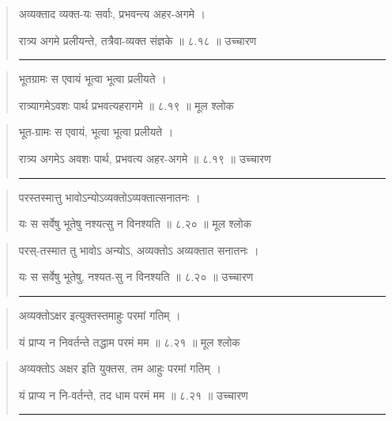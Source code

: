 \begin{quotation}

अव्यक्ताद व्यक्त-यः सर्वाः, प्रभवन्त्य अहर-अगमे  ।  

रात्र्य अगमे प्रलीयन्ते, तत्रैवा-व्यक्त संज्ञके  ॥ ८.१८ ॥  उच्चारण

\noindent\rule{16cm}{0.4pt} 
\end{quotation}


\begin{quotation} 

भूतग्रामः स एवायं भूत्वा भूत्वा प्रलीयते  ।  

रात्र्यागमेऽवशः पार्थ प्रभवत्यहरागमे  ॥ ८.१९ ॥  मूल श्लोक
\end{quotation}

\begin{quotation}

भूत-ग्रामः स एवायं, भूत्वा भूत्वा प्रलीयते  ।  

रात्र्य अगमेऽ अवशः पार्थ, प्रभवत्य अहर-अगमे  ॥ ८.१९ ॥  उच्चारण

\noindent\rule{16cm}{0.4pt} 
\end{quotation}


\begin{quotation} 

परस्तस्मात्तु भावोऽन्योऽव्यक्तोऽव्यक्तात्सनातनः  ।  

यः स सर्वेषु भूतेषु नश्यत्सु न विनश्यति  ॥ ८.२० ॥  मूल श्लोक
\end{quotation}

\begin{quotation}

परस्-तस्मात तु भावोऽ अन्योऽ, अव्यक्तोऽ अव्यक्तात सनातनः  ।  

यः स सर्वेषु भूतेषु, नश्यत-सु न विनश्यति  ॥ ८.२० ॥  उच्चारण

\noindent\rule{16cm}{0.4pt} 
\end{quotation}


\begin{quotation} 

अव्यक्तोऽक्षर इत्युक्तस्तमाहुः परमां गतिम्‌  ।  

यं प्राप्य न निवर्तन्ते तद्धाम परमं मम  ॥ ८.२१ ॥  मूल श्लोक
\end{quotation}

\begin{quotation}
अव्यक्तोऽ अक्षर इति युक्तस, तम आहुः परमां गतिम्‌  ।  

यं प्राप्य न नि-वर्तन्ते, तद धाम परमं मम  ॥ ८.२१ ॥  उच्चारण

\noindent\rule{16cm}{0.4pt} 
\end{quotation}


